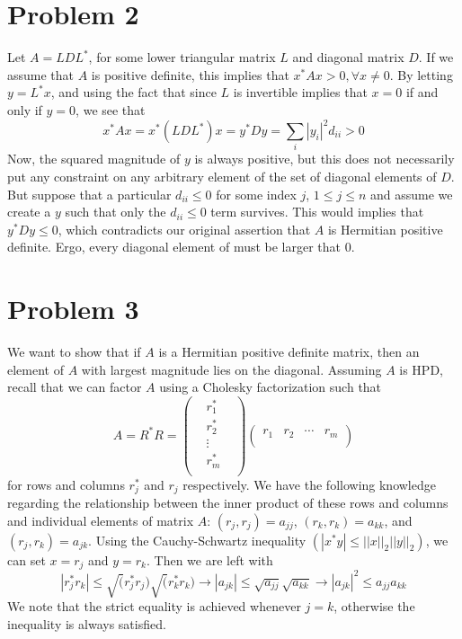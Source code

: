\documentclass[12pt,a4paper,twoside]{article}
\begin{document}
\section{Problem 2}
Let $A=LDL^*$, for some lower triangular matrix $L$ and diagonal matrix $D$. If we assume that $A$ is positive definite, this implies that $x^* Ax>0, \forall x\neq 0$. By letting $y=L^*x$, and using the fact that since $L$ is invertible implies that $x=0$ if and only if $y=0$, we see that
\begin{equation}
x^*Ax=x^*(LDL^*)x=y^*Dy  =\sum_i |y_i|^2 d_{ii} > 0
\end{equation}
Now, the squared magnitude of $y$ is always positive, but this does not necessarily put any constraint on any arbitrary element of the set of diagonal elements of $D$. But suppose that a particular $d_{ii}\leq 0$ for some index $j$, $1\leq j \leq n$ and assume we create a $y$ such that only the $d_{ii}\leq 0 $ term survives. This would implies that $y^* Dy\leq0$, which contradicts our original assertion that $A$ is Hermitian positive definite. Ergo, every diagonal element of must be larger that 0. 


\section{Problem 3}
We want to show that if $A$ is a Hermitian positive definite matrix, then an element of $A$ with largest magnitude lies on the diagonal. Assuming $A$ is HPD, recall that we can factor $A$ using a Cholesky factorization such that
\begin{equation}
A=R^*R=\begin{pmatrix}
&r_1^*&\\
&r_2^*&\\
&\vdots&\\
&r_m^*&\\
\end{pmatrix}
\begin{pmatrix}
r_1&r_2&\cdots&r_m\\
\end{pmatrix}
\end{equation} for rows and columns $r_j^*$ and $r_j$ respectively. We have the following knowledge regarding the relationship between the inner product of these rows and columns and individual elements of matrix $A$: $(r_j,r_j)=a_{jj}$, $(r_k,r_k)=a_{kk}$, and $(r_j,r_k)=a_{jk}$. Using the Cauchy-Schwartz inequality $(|x^*y| \leq ||x||_2 ||y||_2)$, we can set $x=r_j$ and $y=r_k$. Then we are left with
\begin{equation}
|r_j^* r_k | \leq \sqrt(r_j^* r_j)\sqrt(r_k^*r_k) \rightarrow |a_{jk}|\leq \sqrt{a_{jj}} \sqrt{a_{kk}}\rightarrow |a_{jk}|^2\leq a_{jj} a_{kk}
\end{equation} We note that the strict equality is achieved whenever $j=k$, otherwise the inequality is always satisfied. 
\end{document}
